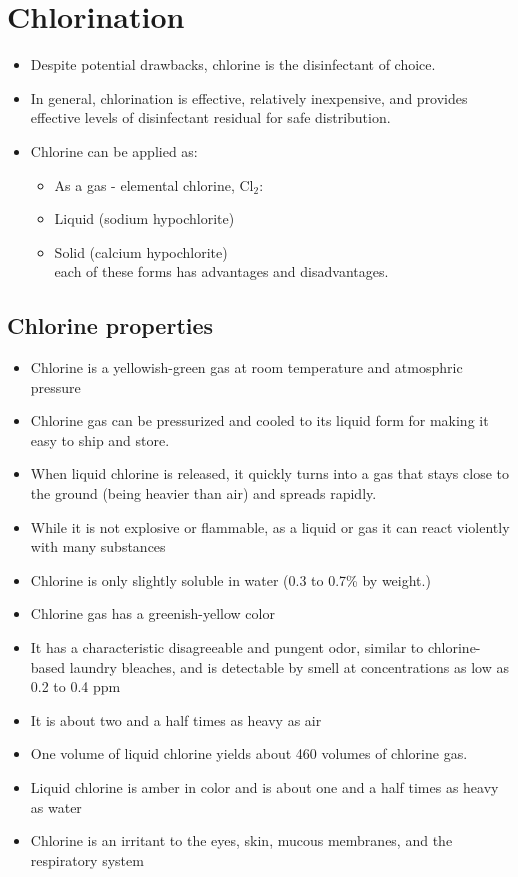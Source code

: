 \section{Chlorination}
\begin{itemize}
\item Despite potential drawbacks, chlorine is the disinfectant of choice.
\item In general, chlorination is effective, relatively inexpensive, and provides effective levels of disinfectant residual for safe distribution. 
\item Chlorine can be applied as:
\begin{itemize}
\item As a gas - elemental chlorine, $\mathrm{Cl}_{2}$:\\
\item Liquid (sodium hypochlorite) 
\item Solid (calcium hypochlorite)\\
each of these forms has advantages and disadvantages.
\end{itemize}
\end{itemize}
\subsection{Chlorine properties}
\begin{itemize}
\item Chlorine is a yellowish-green gas at room temperature and atmosphric pressure
\item Chlorine gas can be pressurized and cooled to its liquid form for making it easy to ship and store. 
\item When liquid chlorine is released, it quickly turns into a gas that stays close to the ground (being heavier than air) and spreads rapidly.
\item While it is not explosive or flammable, as a liquid or gas it can react violently with many substances 
\item Chlorine is only slightly soluble in water (0.3 to 0.7\% by weight.) 
\item Chlorine gas has a greenish-yellow color 
\item It has a characteristic disagreeable and pungent odor, similar to chlorine-based laundry bleaches, and is detectable by smell at concentrations as low as 0.2 to 0.4 ppm
\item It is about two and a half times as heavy as air
\item One volume of liquid chlorine yields about 460 volumes of chlorine gas. 
\item Liquid chlorine is amber in color and is about one and a half times as heavy as water 
\item Chlorine is an irritant to the eyes, skin, mucous membranes, and the respiratory system 
\end{itemize}

